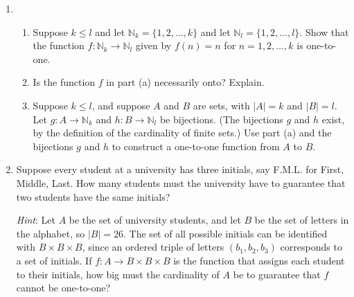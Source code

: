 \documentclass[12pt]{article}
\newcommand{\points}[1]{\marginpar{\hspace{24pt}[#1]}}
\newcommand{\abs}[1]{\lvert #1\rvert}
\newcommand{\N}{\mathbb{N}}
\begin{document}
\thispagestyle{fancy}

 \begin{enumerate}
 \item \begin{enumerate}
        \item Suppose $k\leq l$ and let $\N_k=\{1,2,\ldots, k\}$ and let $\N_l = \{1,2,\ldots, l\}$. Show that the function $f:\N_k\to \N_l$ given by $f(n) = n$ for $n=1,2,\ldots, k$ is one-to-one.\points{2}

\vspace{2in}

	\item Is the function $f$ in part (a) necessarily onto? Explain. \points{1}

\vspace{1.5in}

	\item Suppose $k\leq l$, and suppose $A$ and $B$ are sets, with $\abs{A}=k$ and $\abs{B}=l$. Let $g:A\to \N_k$ and $h:B\to \N_l$ be bijections. (The bijections $g$ and $h$ exist, by the definition of the cardinality of finite sets.) Use part (a) and the bijections $g$ and $h$ to construct a one-to-one function from $A$ to $B$. \points{2}
       \end{enumerate}

\newpage

\item Suppose every student at a university has three initials, say F.M.L. for First, Middle, Last. How many students must the university have to guarantee that two students have the same initials? \points{5}

{\em Hint}: Let $A$ be the set of university students, and let $B$ be the set of letters in the alphabet, so $\abs{B}=26$. The set of all possible initials can be identified with $B\times B\times B$, since an ordered triple of letters $(b_1,b_2,b_3)$ corresponds to a set of initials. If $f:A\to B\times B\times B$ is the function that assigns each student to their initials, how big must the cardinality of $A$ be to guarantee that $f$ cannot be one-to-one?

 \end{enumerate}
\end{document}
